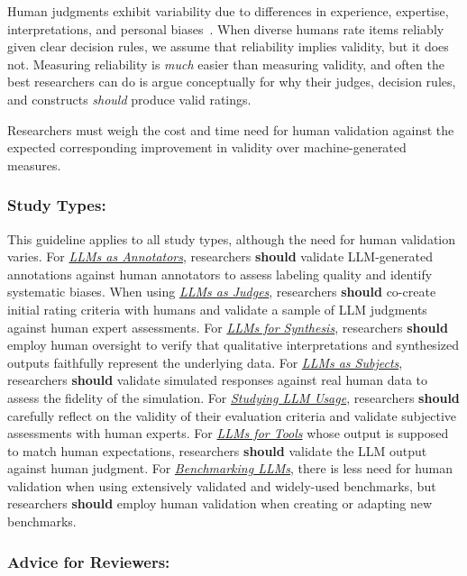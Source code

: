 \documentclass[smallextended]{svjour3}
\newcommand{\should}{\textbf{should}\xspace}
\newcommand{\annotators}{\hyperref[sec:llms-as-annotators]{\emph{LLMs as Annotators}}\xspace}
\newcommand{\judges}{\hyperref[sec:llms-as-judges]{\emph{LLMs as Judges}}\xspace}
\newcommand{\synthesis}{\hyperref[sec:llms-for-synthesis]{\emph{LLMs for Synthesis}}\xspace}
\newcommand{\subjects}{\hyperref[sec:llms-as-subjects]{\emph{LLMs as Subjects}}\xspace}
\newcommand{\llmusage}{\hyperref[sec:studying-llm-usage-in-software-engineering]{\emph{Studying LLM Usage}}\xspace}
\newcommand{\newtools}{\hyperref[sec:llms-for-new-software-engineering-tools]{\emph{LLMs for Tools}}\xspace}
\newcommand{\benchmarkingtasks}{\hyperref[sec:benchmarking-llms-for-software-engineering-tasks]{\emph{Benchmarking LLMs}}\xspace}
\newcommand{\annotators}{\href{/study-types\#llms-as-annotators}{\emph{LLMs as Annotators}}\xspace}
\newcommand{\judges}{\href{/study-types\#llms-as-judges}{\emph{LLMs as Judges}}\xspace}
\newcommand{\synthesis}{\href{/study-types\#llms-for-synthesis}{\emph{LLMs for Synthesis}}\xspace}
\newcommand{\subjects}{\href{/study-types\#llms-as-subjects}{\emph{LLMs as Subjects}}\xspace}
\newcommand{\llmusage}{\href{/study-types\#studying-llm-usage-in-software-engineering}{\emph{Studying LLM Usage}}\xspace}
\newcommand{\newtools}{\href{/study-types\#llms-for-new-software-engineering-tools}{\emph{LLMs for Tools}}\xspace}
\newcommand{\benchmarkingtasks}{\href{/study-types\#benchmarking-llms-for-software-engineering-tasks}{\emph{Benchmarking LLMs}}\xspace}
\newcommand{\guidelinesubsubsection}[1]{\subsubsection{\bfseries #1:}}
\newcommand{\guidelinesubsubsection}[1]{\subsubsection{#1}}
\begin{document}
Human judgments exhibit variability due to differences in experience, expertise, interpretations, and personal biases~\cite{DBLP:journals/pacmhci/McDonaldSF19}. When diverse humans rate items reliably given clear decision rules, we assume that reliability implies validity, but it does not. Measuring reliability is \textit{much} easier than measuring validity, and often the best researchers can do is argue conceptually for why their judges, decision rules, and constructs \textit{should} produce valid ratings.

Researchers must weigh the cost and time need for human validation against the expected corresponding improvement in validity over machine-generated measures. 

\guidelinesubsubsection{Study Types}

This guideline applies to all study types, although the need for human validation varies.
For \annotators, researchers \should validate LLM-generated annotations against human annotators to assess labeling quality and identify systematic biases.
When using \judges, researchers \should co-create initial rating criteria with humans and validate a sample of LLM judgments against human expert assessments.
For \synthesis, researchers \should employ human oversight to verify that qualitative interpretations and synthesized outputs faithfully represent the underlying data.
For \subjects, researchers \should validate simulated responses against real human data to assess the fidelity of the simulation.
For \llmusage, researchers \should carefully reflect on the validity of their evaluation criteria and validate subjective assessments with human experts.
For \newtools whose output is supposed to match human expectations, researchers \should validate the LLM output against human judgment.
For \benchmarkingtasks, there is less need for human validation when using extensively validated and widely-used benchmarks, but researchers \should employ human validation when creating or adapting new benchmarks.

\guidelinesubsubsection{Advice for Reviewers}
\end{document}
